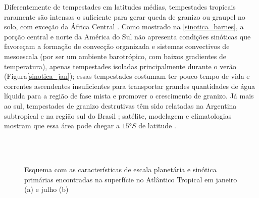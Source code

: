 Diferentemente de tempestades em latitudes médias, tempestades tropicais raramente são intensas o suficiente para gerar queda de granizo ou graupel no solo, com exceção da África Central \cite{Court1982, Hand2011, Cecil2012a}. Como mostrado na \autoref{sinotica_barnes}, a porção central e norte da América do Sul não apresenta condições sinóticas que favoreçam a formação de convecção organizada e sistemas convectivos de mesoescala (por ser um ambiente barotrópico, com baixos gradientes de temperatura), apenas tempestades isoladas principalmente durante o verão (Figura\autoref{sinotica_jan}); essas tempestades costumam ter pouco tempo de vida e correntes ascendentes insuficientes para transportar grandes quantidades de água líquida para a região de fase mista e promover o crescimento de granizo. Já mais ao sul, tempestades de granizo destrutivas têm sido relatadas na Argentina subtropical e na região sul do Brasil \cite{Court1982, Martins2017}; satélite, modelagem e climatologias mostram que essa área pode chegar a $\ang{15}S$ de latitude \cite{Hand2011, Cecil2012a, Albrecht2016}.

\begin{figure}[htb]
	\begin{center}
		\caption{Esquema com as características de escala planetária e sinótica primárias encontradas na superfície no Atlântico Tropical em janeiro (a) e julho (b)} 
		\label{sinotica_barnes}
		 \\
		 \\
	\end{center}
\end{figure}

